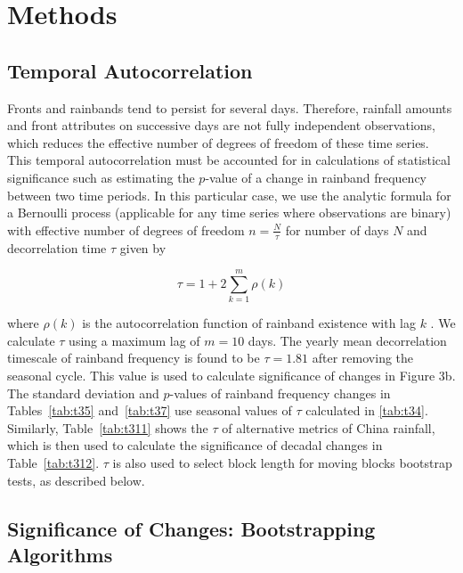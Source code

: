 \documentclass{ametsoc}
\begin{document}
\section{Methods}

\subsection{Temporal Autocorrelation}

	Fronts and rainbands tend to persist for several days. Therefore, rainfall amounts and front attributes on successive days are not fully independent observations, which reduces the effective number of degrees of freedom of these time series. This temporal autocorrelation must be accounted for in calculations of statistical significance such as estimating the $p$-value of a change in rainband frequency between two time periods. In this particular case, we use the analytic formula for a Bernoulli process (applicable for any time series where observations are binary) with effective number of degrees of freedom $n=\frac{N}{\tau}$ for number of days $N$ and decorrelation time $\tau$ given by

\begin{equation*}
\tau=1+2\sum_{k=1}^m \rho(k)
\end{equation*}

	where $\rho(k)$ is the autocorrelation function of rainband existence with lag $k$ \citep{VonStorch1999}. We calculate $\tau$ using a maximum lag of $m=10$ days. The yearly mean decorrelation timescale of rainband frequency is found to be $\tau = 1.81$ after removing the seasonal cycle. This value is used to calculate significance of changes in Figure 3b. The standard deviation and $p$-values of rainband frequency changes in Tables~\ref{tab:t35} and~\ref{tab:t37} use seasonal values of $\tau$ calculated in \ref{tab:t34}. Similarly, Table~\ref{tab:t311} shows the $\tau$ of alternative metrics of China rainfall, which is then used to calculate the significance of decadal changes in Table~\ref{tab:t312}. $\tau$ is also used to select block length for moving blocks bootstrap tests, as described below.

\subsection{Significance of Changes: Bootstrapping Algorithms}
\end{document}
